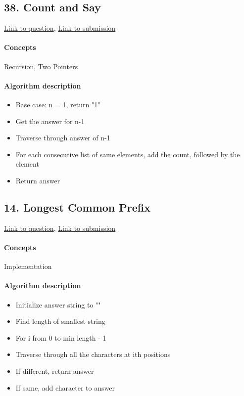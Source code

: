 \documentclass[11pt]{book}
\begin{document}
\subsection{38. Count and Say}
\href{https://leetcode.com/problems/count-and-say/}{Link to question},
\href{https://leetcode.com/submissions/detail/333834219/}{Link to submission}
\paragraph{Concepts}
Recursion, Two Pointers
\paragraph{Algorithm description}
\begin{itemize}
    \item Base case: n = 1, return "1"
    \item Get the answer for n-1
    \item Traverse through answer of n-1
    \item For each consecutive list of same elements, add the count, followed by the element
    \item Return answer
\end{itemize}

\subsection{14. Longest Common Prefix}
\href{https://leetcode.com/problems/longest-common-prefix/}{Link to question},
\href{https://leetcode.com/submissions/detail/333844730/}{Link to submission}
\paragraph{Concepts}
Implementation
\paragraph{Algorithm description}
\begin{itemize}
    \item Initialize answer string to ""
    \item Find length of smallest string
    \item For i from 0 to min length - 1
    \item Traverse through all the characters at ith positions
    \item If different, return answer
    \item If same, add character to answer
\end{itemize}
\end{document}
